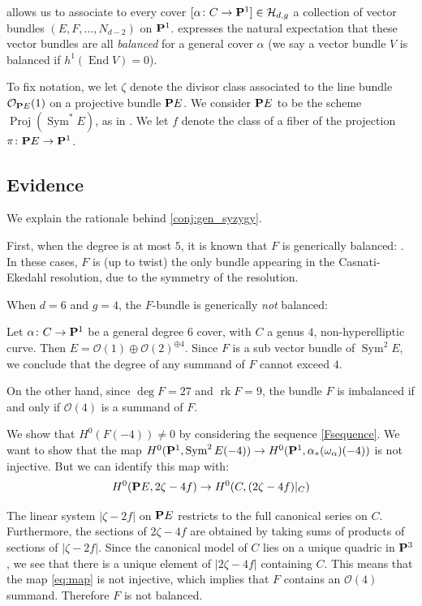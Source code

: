 \documentclass[11pt, two side, letterpaper, final]{amsart}
\renewcommand{\P}{{\bf P}}
\newcommand {\from}{\colon}
\DeclareMathOperator{\Sym}{Sym}
\DeclareMathOperator{\rk}{rk}
\DeclareMathOperator{\Proj}{Proj}
\DeclareMathOperator{\End}{End}
\renewcommand{\H}{{\mathcal{H}}}
\newcommand{\cO}{\mathcal{O}}
\begin{document}
 allows us to associate to every cover $[\alpha \from C \to \P^1] \in \H_{d,g}$ a collection of vector bundles $(E, F, ... , N_{d-2})$ on $\P^1$.  expresses the natural expectation that these vector bundles are all \emph{balanced} for a general cover $\alpha$ (we say a vector bundle $V$ is balanced if $h^{1}(\End V) = 0$).  


To fix notation, we let $\zeta$ denote the divisor class associated to the line bundle $\cO_{\P E}(1)$ on a projective bundle $\P E$.  We consider $\P E$ to be the scheme $\Proj (\Sym^{*}E)$, as in \cite{hartshorne_algebraic_1977}.  We let $f$ denote the class of a fiber of the projection $\pi \from \P E \to \P^1$.

\subsection{Evidence} We explain the rationale behind \cref{conj:gen_syzygy}.

 First, when the degree is at most  $5$, it is known that $F$ is generically balanced:  \cite{deopurkar_picard_2015,bopp_syzygies_2014}.   In these cases, $F$ is (up to twist) the only bundle appearing in the Casnati-Ekedahl resolution, due to the symmetry of the resolution. 
 
 When $d=6$ and $g=4$, the $F$-bundle is generically \emph{not} balanced: 
\begin{example}\label{6,4}
Let $\alpha \from C \to \P^1$ be a general degree $6$ cover, with $C$ a genus $4$, 
non-hyperelliptic curve.  Then $E =   \cO(1) \oplus \cO(2)^{\oplus 4}$. Since $F$ is a sub vector bundle of $\Sym^{2}E$, we conclude that the degree of any summand of $F$ cannot exceed $4$.  

On the other hand, since $\deg F = 27$ and $\rk F = 9$,  the bundle $F$ is imbalanced if and only if $\cO(4)$ is a summand of $F$.

We show that $H^0(F(-4))\neq 0$ by considering the sequence \eqref{Fsequence}. We want
to show that the map $H^0(\P^1, \Sym^2E(-4))  \to H^0( \P^1, \alpha_*(\omega_\alpha) (-4))$ is not injective. But we can identify this map with:
\begin{equation}
\label{eq:map}
H^0(\P E, 2\zeta-4f) \to H^0(C, (2\zeta-4f)|_C)
\end{equation}

The linear system $|\zeta-2f|$ on $\P E$ restricts to the full canonical series on $C$.  Furthermore, the sections of $2\zeta- 4f$ are obtained by taking sums of products of sections of $|\zeta - 2f|$.  Since the canonical model of $C$ lies on a unique quadric in $\P^3$, we see that there is a unique element of $|2\zeta- 4f|$ containing $C$.  This means that the map \eqref{eq:map} is not injective, which implies that $F$ contains an $\cO(4)$ summand. Therefore $F$ is not balanced.
\end{example}
\end{document}
